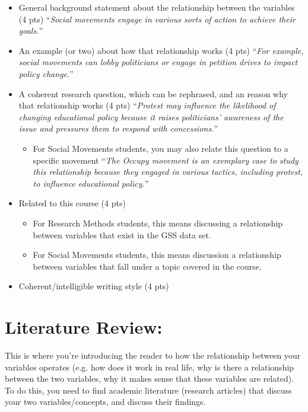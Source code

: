 \documentclass{article}
\begin{document}
\begin{itemize}
\item General background statement about the relationship between the variables (4 pts)
\newline ``{\it{{\color{red}Social movements engage in various sorts of action to achieve their goals.}}}''
\item An example (or two) about how that relationship works (4 pts)
\newline ``{\it{{\color{red}For example, social movements can lobby politicians or engage in petition drives to impact policy change.}}}''
\item A coherent research question, which can be rephrased, and an reason why that relationship works (4 pts)
\newline ``{\it{{\color{red}Protest may influence the likelihood of changing educational policy because it raises politicians' awareness of the issue and pressures them to respond with concessions.}}}''
	\begin{itemize}
	\item For Social Movements students, you may also relate this question to a specific movement 
	\newline ``{\it{{\color{red}The Occupy movement is an exemplary case to study this relationship because they engaged in various tactics, including protest, to influence educational policy.}}}''
	\end{itemize}
\item Related to this course (4 pts)
	\begin{itemize}
	\item For Research Methods students, this means discussing a relationship between variables that exist in the GSS data set. 
	\item For Social Movements students, this means discussion a relationship between variables that fall under a topic covered in the course. 
	\end{itemize}
\item Coherent/intelligible writing style (4 pts)
\end{itemize}



\section*{Literature Review:}
This is where you're introducing the reader to how the relationship between your variables operates (e.g. how does it work in real life, why is there a relationship between the two variables, why it makes sense that these variables are related). To do this, you need to find academic literature (research articles) that discuss your two variables/concepts, and discuss their findings.
\end{document}
